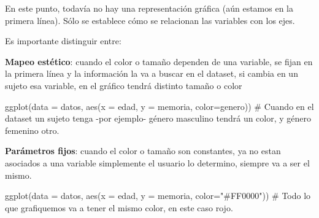 \documentclass[
  letterpaper,
  DIV=11,
  numbers=noendperiod,
  oneside]{scrreprt}
\newenvironment{Shaded}{\begin{snugshade}}{\end{snugshade}}
\newcommand{\AttributeTok}[1]{\textcolor[rgb]{0.40,0.45,0.13}{#1}}
\newcommand{\CommentTok}[1]{\textcolor[rgb]{0.37,0.37,0.37}{#1}}
\newcommand{\FunctionTok}[1]{\textcolor[rgb]{0.28,0.35,0.67}{#1}}
\newcommand{\NormalTok}[1]{\textcolor[rgb]{0.00,0.23,0.31}{#1}}
\newcommand{\StringTok}[1]{\textcolor[rgb]{0.13,0.47,0.30}{#1}}
\begin{document}
En este punto, todavía no hay una representación gráfica (aún estamos en
la primera línea). Sólo se establece cómo se relacionan las variables
con los ejes.

\begin{tcolorbox}[enhanced jigsaw, breakable, rightrule=.15mm, colbacktitle=quarto-callout-tip-color!10!white, bottomtitle=1mm, arc=.35mm, titlerule=0mm, left=2mm, toprule=.15mm, leftrule=.75mm, colback=white, opacitybacktitle=0.6, opacityback=0, colframe=quarto-callout-tip-color-frame, bottomrule=.15mm, coltitle=black, toptitle=1mm, title=\textcolor{quarto-callout-tip-color}{\faLightbulb}\hspace{0.5em}{Mapeo estético vs parámetros fijos}]

Es importante distinguir entre:

\textbf{Mapeo estético}: cuando el color o tamaño dependen de una
variable, se fijan en la primera línea y la información la va a buscar
en el dataset, si cambia en un sujeto esa variable, en el gráfico tendrá
distinto tamaño o color

\begin{Shaded}
\begin{Highlighting}[]
\FunctionTok{ggplot}\NormalTok{(}\AttributeTok{data =}\NormalTok{ datos, }\FunctionTok{aes}\NormalTok{(}\AttributeTok{x =}\NormalTok{ edad, }\AttributeTok{y =}\NormalTok{ memoria, }\AttributeTok{color=}\NormalTok{genero))}
\CommentTok{\# Cuando en el dataset un sujeto tenga {-}por ejemplo{-} género masculino tendrá un color, y género femenino otro.}
\end{Highlighting}
\end{Shaded}

\textbf{Parámetros fijos}: cuando el color o tamaño son constantes, ya
no estan asociados a una variable simplemente el usuario lo determino,
siempre va a ser el mismo.

\begin{Shaded}
\begin{Highlighting}[]
\FunctionTok{ggplot}\NormalTok{(}\AttributeTok{data =}\NormalTok{ datos, }\FunctionTok{aes}\NormalTok{(}\AttributeTok{x =}\NormalTok{ edad, }\AttributeTok{y =}\NormalTok{ memoria, }\AttributeTok{color=}\StringTok{"\#FF0000"}\NormalTok{))}
\CommentTok{\# Todo lo que grafiquemos va a tener el mismo color, en este caso rojo. }
\end{Highlighting}
\end{Shaded}

\end{tcolorbox}
\end{document}
